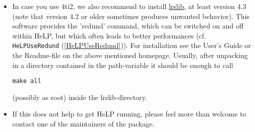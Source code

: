 \documentclass[a4paper,11pt]{report}
\begin{document}
{{\begin{itemize}
 Depending on the settings of your system you might need root privileges (type \texttt{sudo} in front of every command) to unpack the files and install them. To check
whether the installation worked, you can enter \texttt{zsolve} in a terminal. In case one of the required programs (g++ or gmp) was not
installed when running \texttt{make} for the first time, you might need to run \texttt{make clean} and the above commands afterwards again (several times) to compile 4ti2
successfully. If you already have 4ti2 installed in a directory not contained
in the path-variable and want to avoid a re-installation, in many cases the
following helps: 
\begin{itemize}
\item  Start a terminal and access a path written in your bash or
system{\textunderscore}bash. Typically \texttt{usr/local/bin} should work. 

 
\item  Run \texttt{ln -s /[PathToZsolve] zsolve}, where \texttt{[PathToZsolve]} is the path to the executable zsolve. This sets a symlink to the right place.
E.g. \texttt{ln -s /opt/4ti2/bin/zsolve zsolve} was used on the (Linux) computers in Stuttgart. 
\end{itemize}
 
\item  In case you use 4ti2, we also recommend to install \href{http://cgm.cs.mcgill.ca/~avis/C/lrs.html} {lrslib}, at least version 4.3 (note that version 4.2 or older sometimes produces
unwanted behavior). This software provides the 'redund' command, which can be
switched on and off within HeLP, but which often leads to better performances
(cf. \texttt{HeLP{\textunderscore}UseRedund} (\ref{HeLPUseRedund})). For installation see the User's Guide or the Readme-file on the above
mentioned homepage. Usually, after unpacking in a directory contained in the
path-variable it should be enough to call

 \texttt{make all}

 (possibly as root) inside the lrslib-directory. 
\item  If this does not help to get HeLP running, please feel more than welcome to
contact one of the maintainers of the package. 
\end{itemize}
 }

 
}
\end{document}
